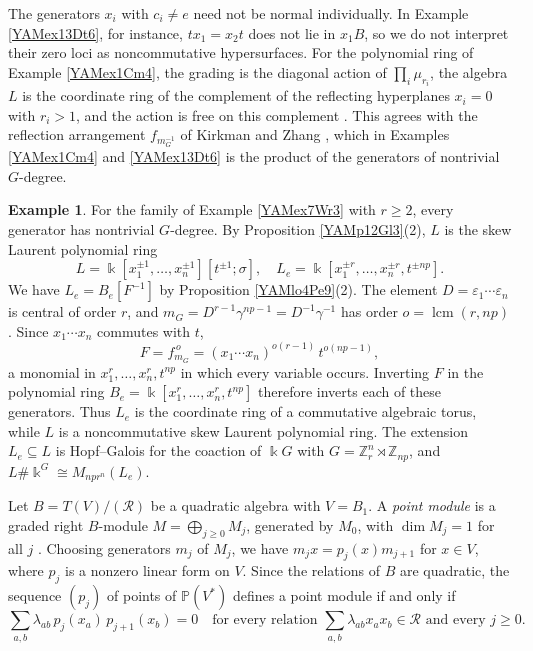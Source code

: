 \documentclass[reqno]{amsart}
\numberwithin{equation}{section}
\theoremstyle{definition}
\newtheorem{example}[equation]{Example}
\theoremstyle{remark}
\theoremstyle{plain}
\newcommand{\kk}{\Bbbk}
\begin{document}
The generators $x_i$ with $c_i\neq e$ need not be normal individually. In Example \ref{YAMex13Dt6}, for instance, $tx_1=x_2t$ does not lie in $x_1B$, so we do not interpret their zero loci as noncommutative hypersurfaces. For the polynomial ring of Example \ref{YAMex1Cm4}, the grading is the diagonal action of $\prod_i\mu_{r_i}$, the algebra $L$ is the coordinate ring of the complement of the reflecting hyperplanes $x_i=0$ with $r_i>1$, and the action is free on this complement \cite[Theorem 1.5]{Ste}. This agrees with the reflection arrangement $f_{m_G^{-1}}$ of Kirkman and Zhang \cite[Definition 2.1]{KZ}, which in Examples \ref{YAMex1Cm4} and \ref{YAMex13Dt6} is the product of the generators of nontrivial $G$-degree.

\begin{example}\label{YAMex20Wl4}
For the family of Example \ref{YAMex7Wr3} with $r\ge2$, every generator has nontrivial $G$-degree. By Proposition \ref{YAMp12Gl3}(2), $L$ is the skew Laurent polynomial ring
\[
L=\kk[x_1^{\pm1},\dots,x_n^{\pm1}][t^{\pm1};\sigma],\quad L_e=\kk[x_1^{\pm r},\dots,x_n^{\pm r},t^{\pm np}].
\]
We have $L_e=B_e[F^{-1}]$ by Proposition \ref{YAMlo4Pe9}(2). The element $D=\varepsilon_1\cdots\varepsilon_n$ is central of order $r$, and $m_G=D^{r-1}\gamma^{np-1}=D^{-1}\gamma^{-1}$ has order $o=\operatorname{lcm}(r,np)$. Since $x_1\cdots x_n$ commutes with $t$,
\[
F=f_{m_G}^{\,o}=(x_1\cdots x_n)^{o(r-1)}\,t^{o(np-1)},
\]
a monomial in $x_1^r,\dots,x_n^r,t^{np}$ in which every variable occurs. Inverting $F$ in the polynomial ring $B_e=\kk[x_1^r,\dots,x_n^r,t^{np}]$ therefore inverts each of these generators. Thus $L_e$ is the coordinate ring of a commutative algebraic torus, while $L$ is a noncommutative skew Laurent polynomial ring. The extension $L_e\subseteq L$ is Hopf--Galois for the coaction of $\kk G$ with $G=\mathbb Z_r^n\rtimes\mathbb Z_{np}$, and $L\#\kk^G\cong M_{npr^n}(L_e)$.
\end{example}

Let $B=T(V)/(\mathcal R)$ be a quadratic algebra with $V=B_1$. A \emph{point module} is a graded right $B$-module $M=\bigoplus_{j\ge0}M_j$, generated by $M_0$, with $\dim M_j=1$ for all $j$ \cite{ATV}. Choosing generators $m_j$ of $M_j$, we have $m_jx=p_j(x)m_{j+1}$ for $x\in V$, where $p_j$ is a nonzero linear form on $V$. Since the relations of $B$ are quadratic, the sequence $(p_j)$ of points of $\mathbb P(V^*)$ defines a point module if and only if
\begin{equation}\label{YAMe97Pt2}
\sum_{a,b}\lambda_{ab}\,p_j(x_a)\,p_{j+1}(x_b)=0\quad\text{for every relation }\sum_{a,b}\lambda_{ab}x_ax_b\in\mathcal R\text{ and every }j\ge0.
\end{equation}
\end{document}

